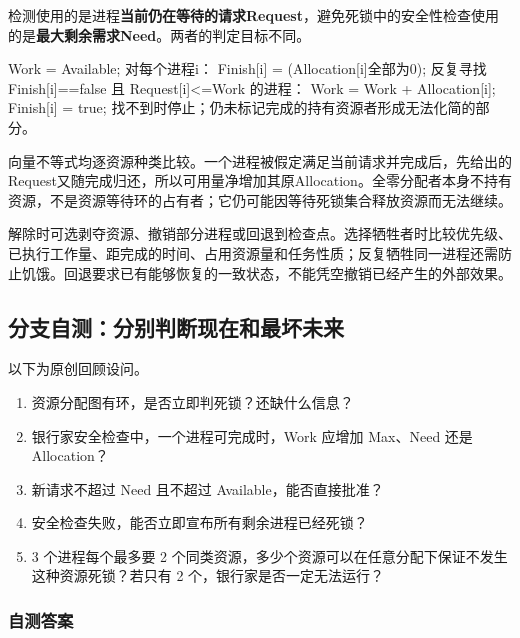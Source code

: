 检测使用的是进程\textbf{当前仍在等待的请求Request}，避免死锁中的安全性检查使用的是\textbf{最大剩余需求Need}。两者的判定目标不同。

\par\medskip\noindent\begin{minipage}{\linewidth}
\begin{codeblock}[language={}]
Work = Available;
对每个进程i：
    Finish[i] = (Allocation[i]全部为0);
反复寻找 Finish[i]==false 且 Request[i]<=Work 的进程：
    Work = Work + Allocation[i];
    Finish[i] = true;
找不到时停止；仍未标记完成的持有资源者形成无法化简的部分。
\end{codeblock}
\end{minipage}\par\medskip

向量不等式均逐资源种类比较。一个进程被假定满足当前请求并完成后，先给出的Request又随完成归还，所以可用量净增加其原Allocation。全零分配者本身不持有资源，不是资源等待环的占有者；它仍可能因等待死锁集合释放资源而无法继续。

解除时可选剥夺资源、撤销部分进程或回退到检查点。选择牺牲者时比较优先级、已执行工作量、距完成的时间、占用资源量和任务性质；反复牺牲同一进程还需防止饥饿。回退要求已有能够恢复的一致状态，不能凭空撤销已经产生的外部效果。

\subsection{分支自测：分别判断现在和最坏未来}\label{OS02-4-review}

以下为原创回顾设问。

\begin{enumerate}
\def\labelenumi{\arabic{enumi}.}
\tightlist
\item
  资源分配图有环，是否立即判死锁？还缺什么信息？
\item
  银行家安全检查中，一个进程可完成时，Work 应增加 Max、Need 还是 Allocation？
\item
  新请求不超过 Need 且不超过 Available，能否直接批准？
\item
  安全检查失败，能否立即宣布所有剩余进程已经死锁？
\item
  3 个进程每个最多要 2 个同类资源，多少个资源可以在任意分配下保证不发生这种资源死锁？若只有 2 个，银行家是否一定无法运行？
\end{enumerate}

\subsubsection{自测答案}\label{OS02-auto-30}

